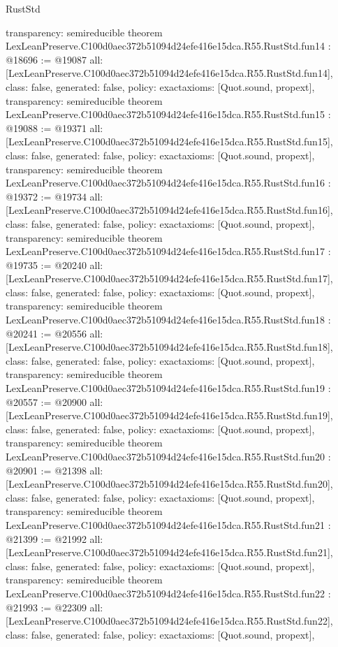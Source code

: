 \begin{lexlean}{RustStd}
\begin{coremodule}
{  transparency: semireducible
}
theorem LexLeanPreserve.C100d0aec372b51094d24efe416e15dca.R55.RustStd.fun14 : @18696 := @19087 {
  all: [LexLeanPreserve.C100d0aec372b51094d24efe416e15dca.R55.RustStd.fun14],
  class: false,
  generated: false,
  policy: exact{axioms: [Quot.sound, propext]},
  transparency: semireducible
}
theorem LexLeanPreserve.C100d0aec372b51094d24efe416e15dca.R55.RustStd.fun15 : @19088 := @19371 {
  all: [LexLeanPreserve.C100d0aec372b51094d24efe416e15dca.R55.RustStd.fun15],
  class: false,
  generated: false,
  policy: exact{axioms: [Quot.sound, propext]},
  transparency: semireducible
}
theorem LexLeanPreserve.C100d0aec372b51094d24efe416e15dca.R55.RustStd.fun16 : @19372 := @19734 {
  all: [LexLeanPreserve.C100d0aec372b51094d24efe416e15dca.R55.RustStd.fun16],
  class: false,
  generated: false,
  policy: exact{axioms: [Quot.sound, propext]},
  transparency: semireducible
}
theorem LexLeanPreserve.C100d0aec372b51094d24efe416e15dca.R55.RustStd.fun17 : @19735 := @20240 {
  all: [LexLeanPreserve.C100d0aec372b51094d24efe416e15dca.R55.RustStd.fun17],
  class: false,
  generated: false,
  policy: exact{axioms: [Quot.sound, propext]},
  transparency: semireducible
}
theorem LexLeanPreserve.C100d0aec372b51094d24efe416e15dca.R55.RustStd.fun18 : @20241 := @20556 {
  all: [LexLeanPreserve.C100d0aec372b51094d24efe416e15dca.R55.RustStd.fun18],
  class: false,
  generated: false,
  policy: exact{axioms: [Quot.sound, propext]},
  transparency: semireducible
}
theorem LexLeanPreserve.C100d0aec372b51094d24efe416e15dca.R55.RustStd.fun19 : @20557 := @20900 {
  all: [LexLeanPreserve.C100d0aec372b51094d24efe416e15dca.R55.RustStd.fun19],
  class: false,
  generated: false,
  policy: exact{axioms: [Quot.sound, propext]},
  transparency: semireducible
}
theorem LexLeanPreserve.C100d0aec372b51094d24efe416e15dca.R55.RustStd.fun20 : @20901 := @21398 {
  all: [LexLeanPreserve.C100d0aec372b51094d24efe416e15dca.R55.RustStd.fun20],
  class: false,
  generated: false,
  policy: exact{axioms: [Quot.sound, propext]},
  transparency: semireducible
}
theorem LexLeanPreserve.C100d0aec372b51094d24efe416e15dca.R55.RustStd.fun21 : @21399 := @21992 {
  all: [LexLeanPreserve.C100d0aec372b51094d24efe416e15dca.R55.RustStd.fun21],
  class: false,
  generated: false,
  policy: exact{axioms: [Quot.sound, propext]},
  transparency: semireducible
}
theorem LexLeanPreserve.C100d0aec372b51094d24efe416e15dca.R55.RustStd.fun22 : @21993 := @22309 {
  all: [LexLeanPreserve.C100d0aec372b51094d24efe416e15dca.R55.RustStd.fun22],
  class: false,
  generated: false,
  policy: exact{axioms: [Quot.sound, propext]},
}
\end{coremodule}
\end{lexlean}
